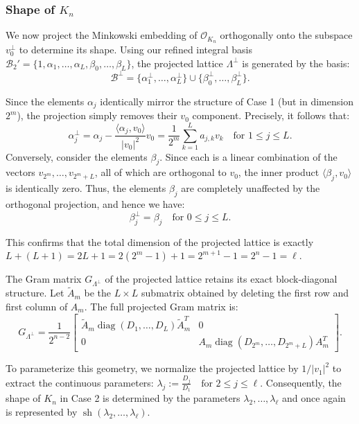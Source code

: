\documentclass{amsart}
\newcommand{\op}[1]{\operatorname{#1}}
\theoremstyle{plain}
\theoremstyle{definition}
\theoremstyle{remark}
\numberwithin{equation}{section}
\begin{document}
\subsubsection*{Shape of \texorpdfstring{$K_n$}{Kn}}

We now project the Minkowski embedding of $\mathcal{O}_{K_n}$ orthogonally onto the subspace $v_0^\perp$ to determine its shape. Using our refined integral basis $\mathcal{B}_2' = \{1, \alpha_1, \ldots, \alpha_L, \beta_0, \ldots, \beta_L\}$, the projected lattice $\Lambda^\perp$ is generated by the basis:
\[
    \mathcal{B}^\perp = \{\alpha_1^\perp, \ldots, \alpha_L^\perp\} \cup \{\beta_0^\perp, \ldots, \beta_L^\perp\}.
\]

Since the elements $\alpha_j$ identically mirror the structure of Case 1 (but in dimension $2^m$), the projection simply removes their $v_0$ component. Precisely, it follows that:
\[
    \alpha_j^\perp = \alpha_j - \frac{\langle \alpha_j, v_0 \rangle}{|v_0|^2} v_0 = \frac{1}{2^m} \sum_{k=1}^L a_{j,k} v_k \quad \text{for } 1 \leq j \leq L.
\]
Conversely, consider the elements $\beta_j$. Since each is a linear combination of the vectors $v_{2^m}, \ldots, v_{2^m+L}$, all of which are orthogonal to $v_0$, the inner product $\langle \beta_j, v_0 \rangle$ is identically zero. Thus, the elements $\beta_j$ are completely unaffected by the orthogonal projection, and hence we have:
\[
    \beta_j^\perp = \beta_j \quad \text{for } 0 \leq j \leq L.
\]

This confirms that the total dimension of the projected lattice is exactly $L + (L + 1) = 2L + 1 = 2(2^m - 1) + 1 = 2^{m+1} - 1 = 2^n - 1 = \ell$.

The Gram matrix $G_{\Lambda^\perp}$ of the projected lattice retains its exact block-diagonal structure. Let $\tilde{A}_m$ be the $L \times L$ submatrix obtained by deleting the first row and first column of $A_m$. The full projected Gram matrix is:
\[
    G_{\Lambda^\perp} = \frac{1}{2^{n-2}} 
    \begin{bmatrix}
        \tilde{A}_m \operatorname{diag}(D_1, \ldots, D_L) \tilde{A}_m^T & 0 \\
        0 & A_m \operatorname{diag}(D_{2^m}, \ldots, D_{2^m+L}) A_m^T
    \end{bmatrix}.
\]

To parameterize this geometry, we normalize the projected lattice by $1/|v_1|^2$ to extract the continuous parameters:   $ \lambda_j := \frac{D_j}{D_1} \quad \text{for } 2 \leq j \leq \ell.$
Consequently, the shape of $K_n$ in Case 2 is  determined by the parameters $\lambda_2, \ldots, \lambda_\ell$ and once again is represented by $\op{sh}(\lambda_2, \dots, \lambda_\ell)$.
\end{document}
